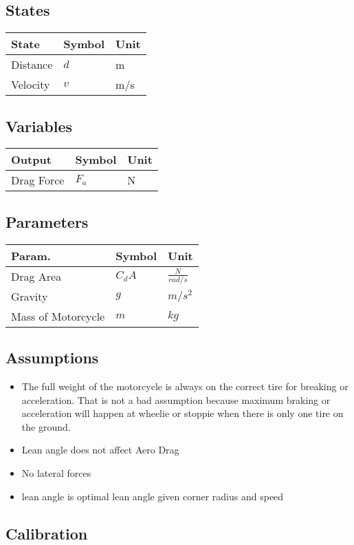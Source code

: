 \documentclass[../SimBALink.tex]{subfiles}
\begin{document}
\subsection{States}
	\begin{tabular}{ l | l | l  }
		State					&	Symbol		&	Unit		\\	\hline
		Distance				&	$d$			& 	m \\
		Velocity 				&	$v$			&	m/s \\
	\end{tabular}
\subsection{Variables}
	\begin{tabular}{ l | l | l  }
		Output					&	Symbol		&	Unit		\\	\hline
		Drag Force				&	$F_a$		&  N
						
	\end{tabular}
\subsection{Parameters}
	\begin{tabular}{ l | l | l  }
		Param.					&	Symbol		&	Unit		\\	\hline
		Drag Area				&	$C_dA$		&	 $\frac{N}{rad/s}$ \\		
		Gravity 				&	$g$			&	$m/s^2$ \\
		Mass of Motorcycle		&	$m$			&  $kg$				
	\end{tabular}

\subsection{Assumptions}
\begin{itemize}
    \item The full weight of the motorcycle is always on the correct tire for breaking or acceleration. That is not a bad assumption because maximum braking or acceleration will happen at wheelie or stoppie when there is only one tire on the ground.
    \item Lean angle does not affect Aero Drag
    \item No lateral forces
    \item lean angle is optimal lean angle given corner radius and speed
\end{itemize}

\subsection{Calibration}
\end{document}
